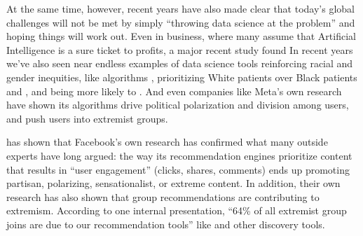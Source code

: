 \documentclass[letterpaper,10pt,english]{jupyterBook}
\begin{document}
\sphinxAtStartPar
At the same time, however, recent years have also made clear that today’s global challenges will not be met by simply “throwing data science at the problem” and hoping things will work out. Even in business, where many assume that Artificial Intelligence is a sure ticket to profits, a major recent study found  In recent years we’ve also seen near endless examples of data science tools reinforcing racial and gender inequities, like algorithms , prioritizing White patients over Black patients  and , and being more likely to . And even companies like Meta’s own research have shown its algorithms drive political polarization and division among users, and push users into extremist groups.%
\begin{footnote}[1]\sphinxAtStartFootnote
{} has shown that Facebook’s own research has confirmed what many outside experts have long argued: the way its recommendation engines prioritize content that results in “user engagement” (clicks, shares, comments) ends up promoting partisan, polarizing, sensationalist, or extreme content. In addition, their own research has also shown that group recommendations are contributing to extremism. According to one internal presentation, “64\% of all extremist group joins are due to our recommendation tools” like  and other discovery tools.
%
\end{footnote}
\end{document}
